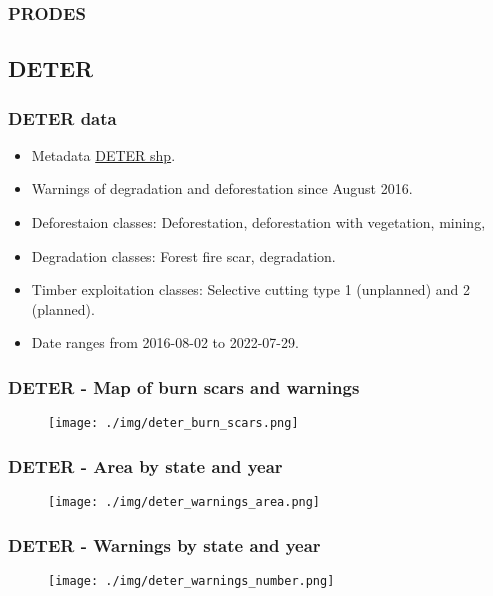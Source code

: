 \documentclass{beamer}
\begin{document}
\begin{frame}
    \frametitle{PRODES}
\end{frame}



\subsection{DETER}



\begin{frame}[fragile]
    \frametitle{DETER data}
    \begin{itemize}
        \item Metadata \href{http://terrabrasilis.dpi.inpe.br/geonetwork/srv/por/catalog.search#/metadata/f2153c4a-915b-48a6-8658-963bdce7366c}{DETER shp}.
        \item Warnings of degradation and deforestation since August 2016.
        \item Deforestaion classes: Deforestation, deforestation with 
            vegetation, mining, 
        \item Degradation classes: Forest fire scar, degradation.
        \item Timber exploitation classes: Selective cutting type 1 (unplanned) 
            and 2 (planned).
        \item Date ranges from 2016-08-02 to 2022-07-29.
    \end{itemize}
\end{frame}



\begin{frame}
    \frametitle{DETER - Map of burn scars and warnings}
    \begin{figure}
        \centering
        \texttt{[image: ./img/deter\_burn\_scars.png]}
    \end{figure}
\end{frame}



\begin{frame}
    \frametitle{DETER - Area by state and year}
    \begin{figure}
        \centering
        \texttt{[image: ./img/deter\_warnings\_area.png]}
    \end{figure}
\end{frame}

\begin{frame}
    \frametitle{DETER - Warnings by state and year}
    \begin{figure}
        \centering
        \texttt{[image: ./img/deter\_warnings\_number.png]}
    \end{figure}
\end{frame}
\end{document}
